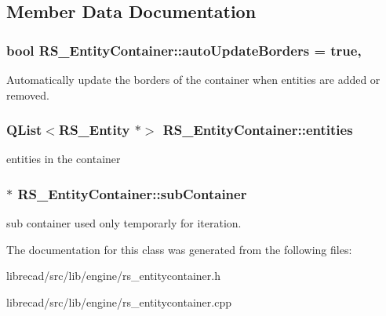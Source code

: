 \subsection{Member Data Documentation}
\hypertarget{classRS__EntityContainer_ad9273917c2483b573239c8743c6ef404}{
\subsubsection[{auto\-Update\-Borders}]{\setlength{\rightskip}{0pt plus 5cm}bool R\-S\-\_\-\-Entity\-Container\-::auto\-Update\-Borders = true\hspace{0.3cm}{\ttfamily [static]}, {\ttfamily [protected]}}}\label{classRS__EntityContainer_ad9273917c2483b573239c8743c6ef404}
Automatically update the borders of the container when entities are added or removed. \hypertarget{classRS__EntityContainer_a0713c529148635cf924054410ac0f945}{
\subsubsection[{entities}]{\setlength{\rightskip}{0pt plus 5cm}Q\-List$<${\bf R\-S\-\_\-\-Entity} $\ast$$>$ R\-S\-\_\-\-Entity\-Container\-::entities\hspace{0.3cm}{\ttfamily [protected]}}}\label{classRS__EntityContainer_a0713c529148635cf924054410ac0f945}
entities in the container \hypertarget{classRS__EntityContainer_a6c8f22f2d0e9d363bfebefd924e352f0}{
\subsubsection[{sub\-Container}]{$\ast$ R\-S\-\_\-\-Entity\-Container\-::sub\-Container\hspace{0.3cm}{\ttfamily [protected]}}}\label{classRS__EntityContainer_a6c8f22f2d0e9d363bfebefd924e352f0}
sub container used only temporarly for iteration. 

The documentation for this class was generated from the following files\-:\begin{DoxyCompactItemize}
\item 
librecad/src/lib/engine/rs\-\_\-entitycontainer.\-h\item 
librecad/src/lib/engine/rs\-\_\-entitycontainer.\-cpp\end{DoxyCompactItemize}
